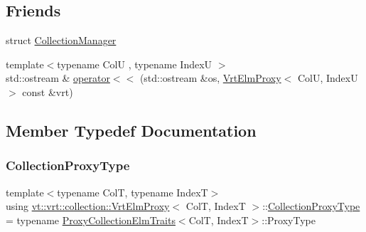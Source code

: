 \subsection*{Friends}
\begin{DoxyCompactItemize}
\item 
struct \hyperlink{structvt_1_1vrt_1_1collection_1_1_vrt_elm_proxy_af9288b1963f434a90b307b5305a49510}{Collection\+Manager}
\item 
{\footnotesize template$<$typename ColU , typename IndexU $>$ }\\std\+::ostream \& \hyperlink{structvt_1_1vrt_1_1collection_1_1_vrt_elm_proxy_ae2031afc9918ae8bdea8f69624ce62d1}{operator$<$$<$} (std\+::ostream \&os, \hyperlink{structvt_1_1vrt_1_1collection_1_1_vrt_elm_proxy}{Vrt\+Elm\+Proxy}$<$ ColU, IndexU $>$ const \&vrt)
\end{DoxyCompactItemize}


\subsection{Member Typedef Documentation}
\mbox{\label{structvt_1_1vrt_1_1collection_1_1_vrt_elm_proxy_a9c343359753f719f62ea62db1fba766a}} 
\subsubsection{\texorpdfstring{Collection\+Proxy\+Type}{CollectionProxyType}}
{\footnotesize\ttfamily template$<$typename ColT, typename IndexT$>$ \\
using \hyperlink{structvt_1_1vrt_1_1collection_1_1_vrt_elm_proxy}{vt\+::vrt\+::collection\+::\+Vrt\+Elm\+Proxy}$<$ ColT, IndexT $>$\+::\hyperlink{structvt_1_1vrt_1_1collection_1_1_vrt_elm_proxy_a9c343359753f719f62ea62db1fba766a}{Collection\+Proxy\+Type} =  typename \hyperlink{structvt_1_1vrt_1_1collection_1_1_proxy_collection_elm_traits}{Proxy\+Collection\+Elm\+Traits}$<$ColT, IndexT$>$\+::Proxy\+Type}

\mbox{\label{structvt_1_1vrt_1_1collection_1_1_vrt_elm_proxy_aacc04b2ee9b318fba6f8641fec4b1316}} 
